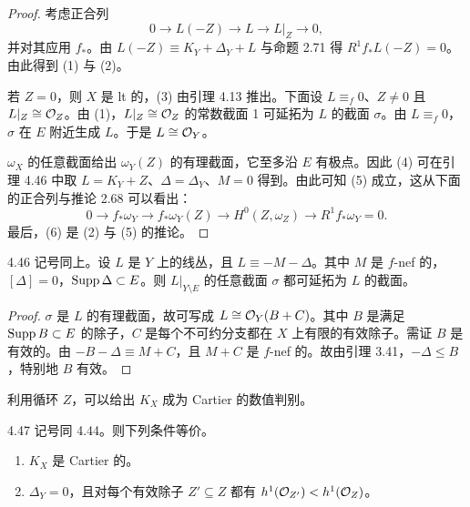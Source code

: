 \begin{proof}
考虑正合列
\[ 0\to L(-Z)\to L\to L|_Z\to 0, \]
并对其应用 $f_*$。由 $L(-Z)\equiv K_Y+\Delta_Y+L$ 与命题 2.71 得 $R^1f_*L(-Z)=0$。由此得到 (1) 与 (2)。

若 $Z=0$，则 $X$ 是 lt 的，(3) 由引理 4.13 推出。下面设 $L\equiv_f 0$、$Z\neq 0$ 且 $L|_Z\cong\mathcal{O}_Z$。由 (1)，$L|_Z\cong\mathcal{O}_Z$ 的常数截面 1 可延拓为 $L$ 的截面 $\sigma$。由 $L\equiv_f 0$，$\sigma$ 在 $E$ 附近生成 $L$。于是 $L\cong\mathcal{O}_Y$。

$\omega_X$ 的任意截面给出 $\omega_Y(Z)$ 的有理截面，它至多沿 $E$ 有极点。因此 (4) 可在引理 4.46 中取 $L=K_Y+Z$、$\Delta=\Delta_Y$、$M=0$ 得到。由此可知 (5) 成立，这从下面的正合列与推论 2.68 可以看出：
\[ 0\to f_*\omega_Y\to f_*\omega_Y(Z)\to H^0(Z,\omega_Z)\to R^1f_*\omega_Y=0. \]
最后，(6) 是 (2) 与 (5) 的推论。
\end{proof}

\begin{lemmap}{4.46}
记号同上。设 $L$ 是 $Y$ 上的线丛，且 $L\equiv -M-\Delta$。其中 $M$ 是 $f$-nef 的，$[\Delta]=0$，$\operatorname{Supp}\Delta\subset E$。则 $L|_{Y\setminus E}$ 的任意截面 $\sigma$ 都可延拓为 $L$ 的截面。
\end{lemmap}

\begin{proof}
$\sigma$ 是 $L$ 的有理截面，故可写成 $L\cong\mathcal{O}_Y(B+C)$。其中 $B$ 是满足 $\operatorname{Supp} B\subset E$ 的除子，$C$ 是每个不可约分支都在 $X$ 上有限的有效除子。需证 $B$ 是有效的。由 $-B-\Delta\equiv M+C$，且 $M+C$ 是 $f$-nef 的。故由引理 3.41，$-\Delta\le B$，特别地 $B$ 有效。
\end{proof}

利用循环 $Z$，可以给出 $K_X$ 成为 Cartier 的数值判别。

\begin{propositionp}{4.47}
记号同 4.44。则下列条件等价。
\begin{enumerate}[label=(\arabic*),leftmargin=2.4em,itemsep=1pt,topsep=2pt]
\item $K_X$ 是 Cartier 的。
\item $\Delta_Y=0$，且对每个有效除子 $Z'\subseteq Z$ 都有 $h^1(\mathcal{O}_{Z'})<h^1(\mathcal{O}_Z)$。
\end{enumerate}
\end{propositionp}

